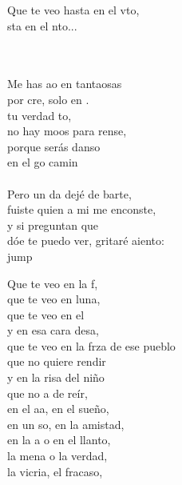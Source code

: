 \begin{cancion}
\begin{chorus}
	Que te veo hasta en el vto, \\
	sta en el nto...\\
	\end{chorus}%
	\jump\\
	   \\
	Me has ao en tantaosas \\
	por cre, solo en . \\
	 tu verdad to, \\
	no hay moos para rense,\\
	porque  serás danso \\
	en el go camin\\
	\jump\\
	Pero un da dejé de barte, \\
	fuiste  quien a mi me enconste, \\
	y si  preguntan que \\
	dóe te puedo ver, gritaré aiento:\\jump\\
	\begin{chorus}%
	Que te veo en la f, \\
	que te veo en luna,\\
	que te veo en el  \\
	y en esa cara desa,\\
	que te veo en la frza de ese pueblo\\
	que no  quiere rendir\\
	y en la risa del niño \\
	que no a de reír,\\
	en el aa, en el sueño, \\
	en un so, en la amistad,\\
	en la a o en el llanto, \\
	la mena o la verdad,\\
	la vicria, el fracaso, \\

\end{chorus}
\end{cancion}

